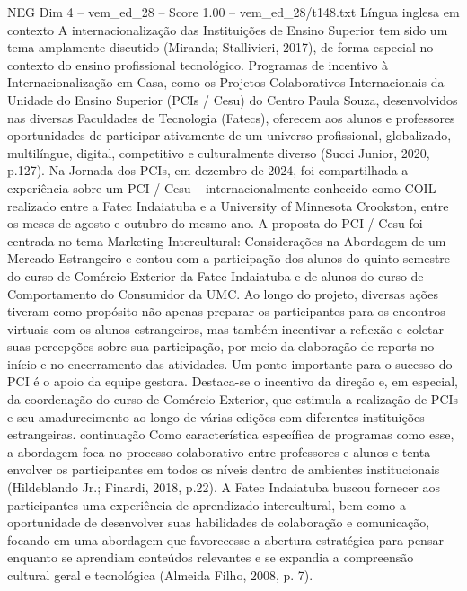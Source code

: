 \begin{textsample}{NEG Dim 4 – vem\_ed\_28 – Score 1.00 – vem\_ed\_28/t148.txt}  \label{ex:f4_neg_131}
Língua inglesa em contexto A internacionalização das Instituições de Ensino Superior tem sido um tema amplamente discutido (Miranda; Stallivieri, 2017), de forma especial no contexto do ensino profissional tecnológico.
Programas de incentivo à Internacionalização em Casa, como os Projetos Colaborativos Internacionais da Unidade do Ensino Superior (PCIs / Cesu) do Centro Paula Souza, desenvolvidos nas diversas Faculdades de Tecnologia (Fatecs), oferecem aos alunos e professores oportunidades de participar ativamente de um universo profissional, globalizado, multilíngue, digital, competitivo e culturalmente diverso (Succi Junior, 2020, p.127).
Na Jornada dos PCIs, em dezembro de 2024, foi compartilhada a experiência sobre um PCI / Cesu – internacionalmente conhecido como COIL – realizado entre a Fatec Indaiatuba e a University of Minnesota Crookston, entre os meses de agosto e outubro do mesmo ano.
A proposta do PCI / Cesu foi centrada no tema Marketing Intercultural: Considerações na Abordagem de um Mercado Estrangeiro e contou com a participação dos alunos do quinto semestre do curso de Comércio Exterior da Fatec Indaiatuba e de alunos do curso de Comportamento do Consumidor da UMC.
Ao longo do projeto, diversas ações tiveram como propósito não apenas preparar os participantes para os encontros virtuais com os alunos estrangeiros, mas também incentivar a reflexão e coletar suas percepções sobre sua participação, por meio da elaboração de reports no início e no encerramento das atividades.
Um ponto importante para o sucesso do PCI é o apoio da equipe gestora.
Destaca-se o incentivo da direção e, em especial, da coordenação do curso de Comércio Exterior, que estimula a realização de PCIs e seu amadurecimento ao longo de várias edições com diferentes instituições estrangeiras. continuação Como característica específica de programas como esse, a abordagem foca no processo colaborativo entre professores e alunos e tenta envolver os participantes em todos os níveis dentro de ambientes institucionais (Hildeblando Jr.; Finardi, 2018, p.22).
A Fatec Indaiatuba buscou fornecer aos participantes uma experiência de aprendizado intercultural, bem como a oportunidade de desenvolver suas habilidades de colaboração e comunicação, focando em uma abordagem que favorecesse a abertura estratégica para pensar enquanto se aprendiam conteúdos relevantes e se expandia a compreensão cultural geral e tecnológica (Almeida Filho, 2008, p. 7).

\end{textsample}
